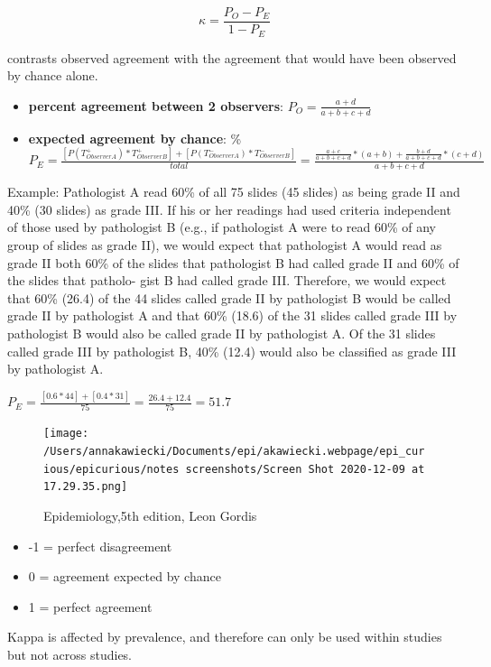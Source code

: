 \documentclass[
]{article}
\providecommand{\tightlist}{%
  \setlength{\itemsep}{0pt}\setlength{\parskip}{0pt}}
\begin{document}
\[\kappa= \frac{P_O-P_E}{1-P_E}\]

contrasts observed agreement with the agreement that would have been
observed by chance alone.

\begin{itemize}
\item
  \textbf{percent agreement between 2 observers}:
  \(P_O = \frac{a+d}{a+b+c+d}\)
\item
  \textbf{expected agreement by chance}: \%
  \(P_E = \frac{[P(T_{ObserverA}^+) * T_{ObserverB}^+] + [P(T_{ObserverA}^-) * T_{ObserverB}^-]}{total}=\frac{\frac{a+c}{a+b+c+d}*(a+b) + \frac{b+d}{a+b+c+d}*(c+d)}{a+b+c+d}\)
\end{itemize}

Example: Pathologist A read 60\% of all 75 slides (45 slides) as being
grade II and 40\% (30 slides) as grade III. If his or her readings had
used criteria independent of those used by pathologist B (e.g., if
pathologist A were to read 60\% of any group of slides as grade II), we
would expect that pathologist A would read as grade II both 60\% of the
slides that pathologist B had called grade II and 60\% of the slides
that patholo- gist B had called grade III. Therefore, we would expect
that 60\% (26.4) of the 44 slides called grade II by pathologist B would
be called grade II by pathologist A and that 60\% (18.6) of the 31
slides called grade III by pathologist B would also be called grade II
by pathologist A. Of the 31 slides called grade III by pathologist B,
40\% (12.4) would also be classified as grade III by pathologist A.

\(P_E = \frac{[0.6 * 44] + [0.4 * 31]}{75}= \frac{26.4+ 12.4}{75}= 51.7\)

\begin{figure}
\centering
\texttt{[image: /Users/annakawiecki/Documents/epi/akawiecki.webpage/epi\_curious/epicurious/notes screenshots/Screen Shot 2020-12-09 at 17.29.35.png]}
\caption{Epidemiology,5th edition, Leon Gordis}
\end{figure}

\begin{itemize}
\tightlist
\item
  -1 = perfect disagreement
\item
  0 = agreement expected by chance
\item
  1 = perfect agreement
\end{itemize}

Kappa is affected by prevalence, and therefore can only be used within
studies but not across studies.
\end{document}
